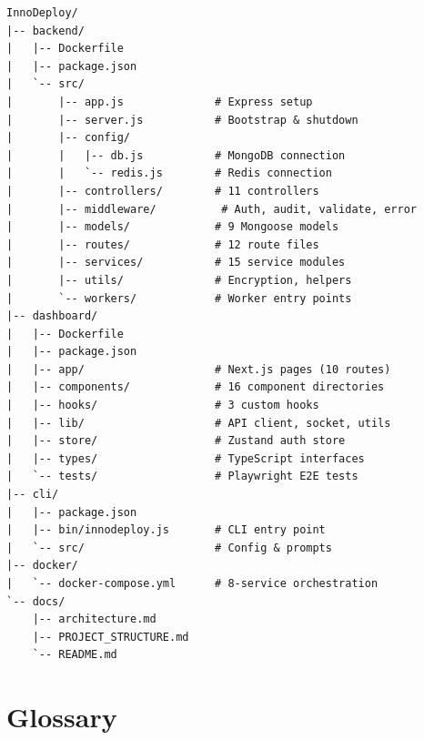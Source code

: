 \documentclass[12pt,a4paper,twoside]{report}
\begin{document}
\begin{lstlisting}[basicstyle=\ttfamily\footnotesize, frame=none, numbers=none]
InnoDeploy/
|-- backend/
|   |-- Dockerfile
|   |-- package.json
|   `-- src/
|       |-- app.js              # Express setup
|       |-- server.js           # Bootstrap & shutdown
|       |-- config/
|       |   |-- db.js           # MongoDB connection
|       |   `-- redis.js        # Redis connection
|       |-- controllers/        # 11 controllers
|       |-- middleware/          # Auth, audit, validate, error
|       |-- models/             # 9 Mongoose models
|       |-- routes/             # 12 route files
|       |-- services/           # 15 service modules
|       |-- utils/              # Encryption, helpers
|       `-- workers/            # Worker entry points
|-- dashboard/
|   |-- Dockerfile
|   |-- package.json
|   |-- app/                    # Next.js pages (10 routes)
|   |-- components/             # 16 component directories
|   |-- hooks/                  # 3 custom hooks
|   |-- lib/                    # API client, socket, utils
|   |-- store/                  # Zustand auth store
|   |-- types/                  # TypeScript interfaces
|   `-- tests/                  # Playwright E2E tests
|-- cli/
|   |-- package.json
|   |-- bin/innodeploy.js       # CLI entry point
|   `-- src/                    # Config & prompts
|-- docker/
|   `-- docker-compose.yml      # 8-service orchestration
`-- docs/
    |-- architecture.md
    |-- PROJECT_STRUCTURE.md
    `-- README.md
\end{lstlisting}

\chapter{Glossary}
\end{document}
